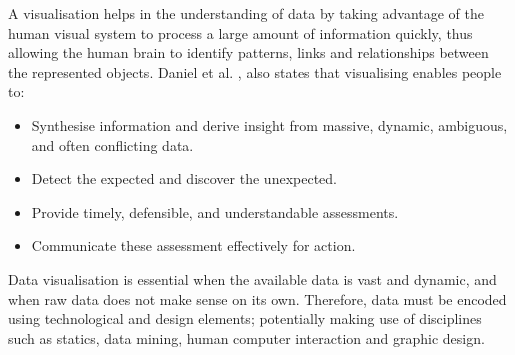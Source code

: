 \fi
A visualisation helps in the understanding of data  by taking advantage of the human visual system to process a large amount of information quickly, thus allowing the human brain to identify patterns, links and relationships between the represented objects. Daniel et al. \cite{KeimDaniel2010}, also states that visualising enables people to: 
\begin{displayquote}
	\begin{itemize}
\item  Synthesise information and derive insight from massive, dynamic, ambiguous, and often conflicting data.
\item Detect the expected and discover the unexpected.
\item Provide timely, defensible, and understandable assessments.
\item Communicate these assessment effectively for action.
	\end{itemize}
\end{displayquote}

Data visualisation is essential when the available data is vast and dynamic, and when raw data does not make sense on its own. Therefore, data must be encoded using technological and design elements;  potentially making use of disciplines such as statics, data mining, human computer interaction and graphic design. 

